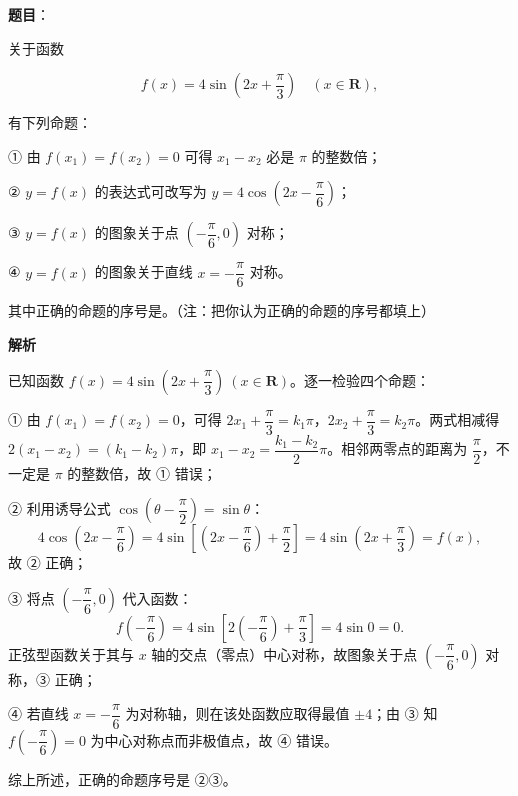 \begin{answer}

\textbf{题目}：

关于函数

\nopagebreak[4]
\[
f(x)=4\sin\left(2x+\frac\pi3\right)\quad (x\in\mathbf{R}),
\]

有下列命题：

① 由 $f(x_1)=f(x_2)=0$ 可得 $x_1-x_2$ 必是 $\pi$ 的整数倍；

② $y=f(x)$ 的表达式可改写为 $y=4\cos\left(2x-\dfrac\pi6\right)$；

③ $y=f(x)$ 的图象关于点 $\left(-\dfrac\pi6,0\right)$ 对称；

④ $y=f(x)$ 的图象关于直线 $x=-\dfrac\pi6$ 对称。

其中正确的命题的序号是\gkblank{}。（注：把你认为正确的命题的序号都填上）

\textbf{解析}

已知函数 $f(x)=4\sin\left(2x+\dfrac\pi3\right)\ (x\in\mathbf{R})$。逐一检验四个命题：

① 由 $f(x_1)=f(x_2)=0$，可得 $2x_1+\dfrac\pi3 = k_1\pi$，$2x_2+\dfrac\pi3 = k_2\pi$。两式相减得 $2(x_1-x_2) = (k_1-k_2)\pi$，即 $x_1-x_2 = \dfrac{k_1-k_2}{2}\pi$。相邻两零点的距离为 $\dfrac\pi2$，不一定是 $\pi$ 的整数倍，故 ① 错误；

② 利用诱导公式 $\cos\left(\theta-\dfrac\pi2\right) = \sin\theta$：
\nopagebreak[4]
\[
4\cos\left(2x-\frac\pi6\right) = 4\sin\left[\left(2x-\frac\pi6\right) + \frac\pi2\right] = 4\sin\left(2x+\frac\pi3\right) = f(x),
\]
故 ② 正确；

③ 将点 $\left(-\dfrac\pi6, 0\right)$ 代入函数：
\nopagebreak[4]
\[
f\left(-\frac\pi6\right) = 4\sin\left[2\left(-\frac\pi6\right) + \frac\pi3\right] = 4\sin 0 = 0.
\]
正弦型函数关于其与 $x$ 轴的交点（零点）中心对称，故图象关于点 $\left(-\dfrac\pi6, 0\right)$ 对称，③ 正确；

④ 若直线 $x=-\dfrac\pi6$ 为对称轴，则在该处函数应取得最值 $\pm4$；由 ③ 知 $f\left(-\dfrac\pi6\right)=0$ 为中心对称点而非极值点，故 ④ 错误。

综上所述，正确的命题序号是 ②③。


\end{answer}
